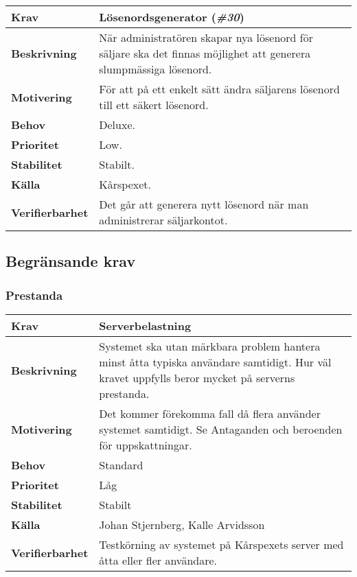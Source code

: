 \documentclass[a4paper, twoside, 11pt, titlepage]{article}
\begin{document}
		\begin{tabular} { p{2.6cm} p{12.5cm} }
			\hline
			\sffamily\textbf{Krav} & Lösenordsgenerator (\emph{\#30})  \\
			\hline
			\sffamily\textbf{Beskrivning} & När administratören skapar nya lösenord för säljare ska det finnas möjlighet att generera slumpmässiga lösenord.  \\
			\hline
			\sffamily\textbf{Motivering} & För att på ett enkelt sätt ändra säljarens lösenord till ett säkert lösenord.  \\
			\hline
			\sffamily\textbf{Behov} & Deluxe.  \\
			\hline
			\sffamily\textbf{Prioritet} & Low.  \\
			\hline
			\sffamily\textbf{Stabilitet} & Stabilt.  \\
			\hline
			\sffamily\textbf{Källa} & Kårspexet.  \\
			\hline
			\sffamily\textbf{Verifierbarhet} & Det går att generera nytt lösenord när man administrerar säljarkontot.  \\
			\hline
		\end{tabular}


	\subsection{Begränsande krav}



		\subsubsection{Prestanda}


		\begin{tabular} { p{2.6cm} p{12.5cm} }
			\hline
			\sffamily\textbf{Krav} & Serverbelastning  \\
			\hline
			\sffamily\textbf{Beskrivning} & Systemet ska utan märkbara problem hantera minst åtta typiska användare samtidigt. Hur väl kravet uppfylls beror mycket på serverns prestanda.  \\
			\hline
			\sffamily\textbf{Motivering} & Det kommer förekomma fall då flera använder systemet samtidigt. Se Antaganden och beroenden för uppskattningar.  \\
			\hline
			\sffamily\textbf{Behov} & Standard  \\
			\hline
			\sffamily\textbf{Prioritet} & Låg  \\
			\hline
			\sffamily\textbf{Stabilitet} & Stabilt  \\
			\hline
			\sffamily\textbf{Källa} & Johan Stjernberg, Kalle Arvidsson  \\
			\hline
			\sffamily\textbf{Verifierbarhet} & Testkörning av systemet på Kårspexets server med åtta eller fler användare.  \\
			\hline
		\end{tabular}
		\vspace{6mm}
\end{document}
